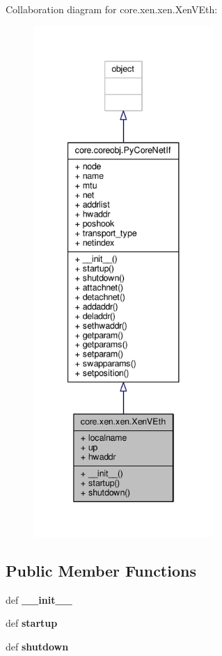 Collaboration diagram for core.\+xen.\+xen.\+Xen\+V\+Eth\+:
\nopagebreak
\begin{figure}[H]
\begin{center}
\leavevmode
\includegraphics[height=550pt]{classcore_1_1xen_1_1xen_1_1_xen_v_eth__coll__graph}
\end{center}
\end{figure}
\subsection*{Public Member Functions}
\begin{DoxyCompactItemize}
\item 
\hypertarget{classcore_1_1xen_1_1xen_1_1_xen_v_eth_a13147f8bc54c594ee87e1c83ab56376e}{def {\bfseries \+\_\+\+\_\+init\+\_\+\+\_\+}}\label{classcore_1_1xen_1_1xen_1_1_xen_v_eth_a13147f8bc54c594ee87e1c83ab56376e}

\item 
\hypertarget{classcore_1_1xen_1_1xen_1_1_xen_v_eth_a99f68c6a17b0e2875a43bb545377a565}{def {\bfseries startup}}\label{classcore_1_1xen_1_1xen_1_1_xen_v_eth_a99f68c6a17b0e2875a43bb545377a565}

\item 
\hypertarget{classcore_1_1xen_1_1xen_1_1_xen_v_eth_ac6126fc6290c587de76262cbba69bb8e}{def {\bfseries shutdown}}\label{classcore_1_1xen_1_1xen_1_1_xen_v_eth_ac6126fc6290c587de76262cbba69bb8e}

\end{DoxyCompactItemize}
